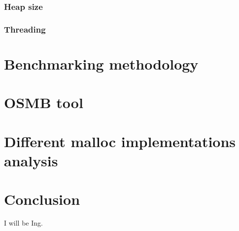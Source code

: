 \subsection{Heap size}
\subsection{Threading}
\chapter{Benchmarking methodology}
\chapter{OSMB tool}
\chapter{Different malloc implementations analysis}
\chapter{Conclusion}
I will be Ing. \cite{Pravidla}

